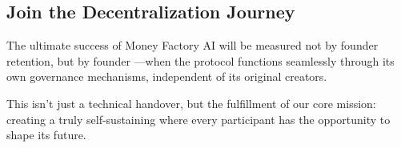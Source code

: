 \subsection*{Join the Decentralization Journey}

The ultimate success of Money Factory AI will be measured not by founder retention, but by founder —when the protocol functions seamlessly through its own governance mechanisms, independent of its original creators.

This isn't just a technical handover, but the fulfillment of our core mission: creating a truly self-sustaining  where every participant has the opportunity to shape its future.

\begin{center}
\end{center}
